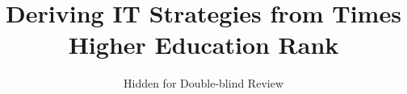 \documentclass[sigconf]{acmart}
\begin{document}
\title{Deriving IT Strategies from Times Higher Education Rank}


\author{Hidden for Double-blind Review}

%
%
%
%
%
%

\renewcommand{\shortauthors}{Trovato and Tobin, et al.}
\end{document}
